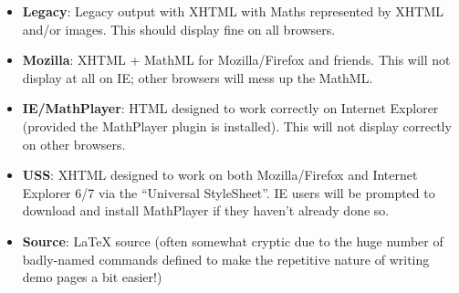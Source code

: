 \begin{itemize}
  \item \textbf{Legacy}: Legacy output with XHTML with Maths represented
  by XHTML and/or images. This should display fine on all browsers.

  \item \textbf{Mozilla}: XHTML + MathML for Mozilla/Firefox and friends.
  This will not display at all on IE; other browsers will mess up the MathML.

  \item \textbf{IE/MathPlayer}: HTML designed to work correctly on Internet
  Explorer (provided the MathPlayer plugin is installed). This will not
  display correctly on other browsers.

  \item \textbf{USS}: XHTML designed to work on both Mozilla/Firefox and Internet
  Explorer 6/7 via the ``Universal StyleSheet''. IE users will be prompted to
  download and install MathPlayer if they haven't already done so.

  \item \textbf{Source}: LaTeX source (often somewhat cryptic due to the huge number
  of badly-named commands defined to make the repetitive nature of writing demo pages
  a bit easier!)
\end{itemize}
